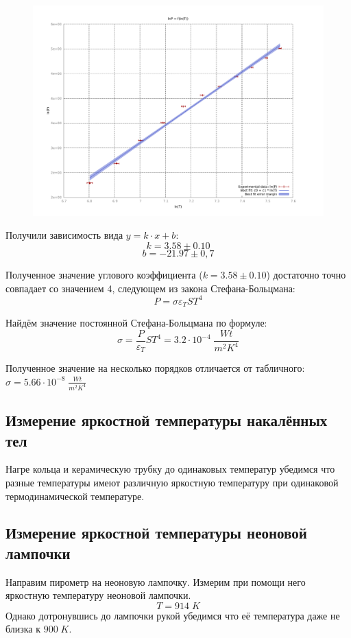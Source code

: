 \documentclass{article}
\begin{document}
\begin{figure}[H]
	\includegraphics[width=\textwidth]{plot.pdf}
\end{figure}

Получили зависимость вида \( y = k\cdot x + b \):
\[ k = 3.58 \pm 0.10 \]
\[ b = -21.97 \pm 0,7 \]


Полученное значение углового коэффициента (\( k = 3.58 \pm 0.10 \)) достаточно точно совпадает со
значением 4, следующем из закона Стефана-Больцмана:
\[ P = \sigma \varepsilon_T S T^4  \]

Найдём значение постоянной Стефана-Больцмана по формуле:
\[ \sigma = \frac{P}{\varepsilon_T}{ST^4} = 3.2\cdot 10^{-4}\; \frac{Wt}{m^2 K^4} \]

Полученное значение на несколько порядков отличается от табличного: \( \sigma = 5.66\cdot 10^{-8}\; \frac{Wt}{m^2K^4} \)
\subsection{Измерение яркостной температуры накалённых тел}
Нагре кольца и керамическую трубку до одинаковых температур убедимся что разные температуры имеют различную
яркостную температуру при одинаковой термодинамической температуре.
\subsection {Измерение яркостной температуры неоновой лампочки}

Направим пирометр на неоновую лампочку. Измерим при помощи него яркостную температуру неоновой лампочки.
\[ T = 914\; K \]
Однако дотронувшись до лампочки рукой убедимся что её температура даже не близка к \(900\; K\).
\end{document}
